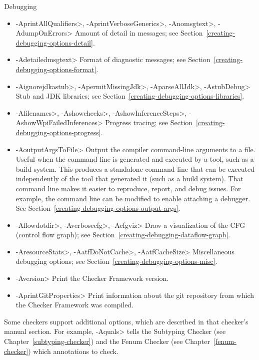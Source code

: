 Debugging
\begin{itemize}
\item
 \<-AprintAllQualifiers>,
 \<-AprintVerboseGenerics>,
 \<-Anomsgtext>,
 \<-AdumpOnErrors>
Amount of detail in messages; see Section~\ref{creating-debugging-options-detail}.

\item
 \<-Adetailedmsgtext>
Format of diagnostic messages; see Section~\ref{creating-debugging-options-format}.

\item
 \<-Aignorejdkastub>,
 \<-ApermitMissingJdk>,
 \<-AparseAllJdk>,
 \<-AstubDebug>
Stub and JDK libraries; see Section~\ref{creating-debugging-options-libraries}.

\item
 \<-Afilenames>,
 \<-Ashowchecks>,
 \<-AshowInferenceSteps>,
 \<-AshowWpiFailedInferences>
Progress tracing; see Section~\ref{creating-debugging-options-progress}.

\item
\<-AoutputArgsToFile>
Output the compiler command-line arguments to a file.  Useful when the
command line is generated and executed by a tool, such as a build system.
This produces a standalone command line that can be executed independently
of the tool that generated it (such as a build system).
That command line makes it easier to reproduce, report, and debug issues.
For example, the command line can be modified to enable attaching a debugger.
See Section~\ref{creating-debugging-options-output-args}.

\item
 \<-Aflowdotdir>,
 \<-Averbosecfg>,
 \<-Acfgviz>
 Draw a visualization of the CFG (control flow graph); see
 Section~\ref{creating-debugging-dataflow-graph}.

\item
 \<-AresourceStats>,
 \<-AatfDoNotCache>,
 \<-AatfCacheSize>
Miscellaneous debugging options; see Section~\ref{creating-debugging-options-misc}.

\item
 \<-Aversion>
Print the Checker Framework version.

\item
 \<-AprintGitProperties>
Print information about the git repository from which the Checker Framework
was compiled.

\end{itemize}


\noindent
Some checkers support additional options, which are described in that
checker's manual section.
For example, \<-Aquals> tells
the Subtyping Checker (see Chapter~\ref{subtyping-checker}) and the Fenum Checker
(see Chapter~\ref{fenum-checker}) which annotations to check.


